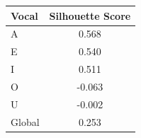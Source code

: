 \begin{tabular}{lc}
\toprule
\rowcolor{col01}
Vocal & Silhouette Score \\
\midrule
A & 0.568 \\
E & 0.540 \\
I & 0.511 \\
O & -0.063 \\
U & -0.002 \\
Global & 0.253 \\
\bottomrule
\end{tabular}
